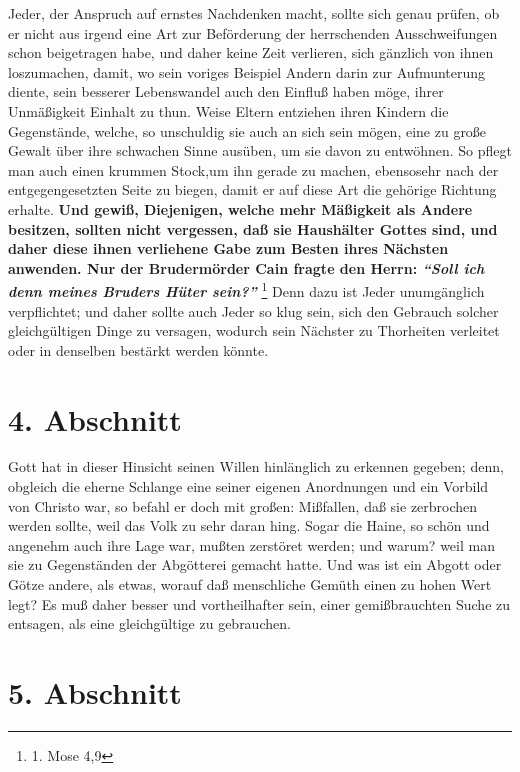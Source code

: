 Jeder, der Anspruch auf ernstes Nachdenken macht, sollte sich genau prüfen, ob
er nicht aus irgend eine Art zur Beförderung der herrschenden Ausschweifungen
schon beigetragen habe, und daher keine Zeit verlieren, sich gänzlich von ihnen
loszumachen, damit, wo sein voriges Beispiel Andern darin zur Aufmunterung
diente, sein besserer Lebenswandel auch den Einfluß haben möge, ihrer
Unmäßigkeit Einhalt zu thun. Weise Eltern
entziehen ihren Kindern die
Gegenstände, welche, so unschuldig sie auch an sich sein mögen, eine zu große
Gewalt über ihre schwachen Sinne ausüben, um sie davon zu entwöhnen. So pflegt
man auch einen krummen Stock,um ihn gerade zu machen, ebensosehr nach der
entgegengesetzten Seite zu biegen, damit er auf diese Art die gehörige Richtung
erhalte. \textbf{Und gewiß, Diejenigen, welche mehr
Mäßigkeit als Andere besitzen,
sollten nicht vergessen, daß sie Haushälter Gottes sind, und daher diese ihnen
verliehene Gabe zum Besten ihres Nächsten anwenden. Nur der Brudermörder
Cain
fragte den Herrn:
\textit{"`Soll ich denn meines Bruders Hüter sein?"'}}
\footnote{1. Mose 4,9}
Denn dazu ist Jeder unumgänglich verpflichtet; und daher sollte auch Jeder
so klug sein, sich den Gebrauch solcher gleichgültigen Dinge zu versagen,
wodurch sein Nächster zu Thorheiten verleitet oder in denselben bestärkt werden
könnte.

\section{4. Abschnitt} \label{kap18_ab4}

Gott hat in dieser Hinsicht seinen Willen hinlänglich zu erkennen gegeben; denn,
obgleich die eherne Schlange eine seiner eigenen Anordnungen und
ein Vorbild von
Christo war, so befahl er doch mit großen: Mißfallen, daß sie zerbrochen werden
sollte, weil das Volk zu sehr daran hing. Sogar die Haine, so schön und angenehm
auch ihre Lage war, mußten zerstöret werden; und warum? weil man sie zu
Gegenständen der Abgötterei gemacht hatte. Und was ist ein
Abgott oder Götze
andere, als etwas, worauf daß menschliche Gemüth einen zu hohen Wert legt? Es
muß daher besser und vortheilhafter sein, einer gemißbrauchten Suche zu
entsagen, als eine gleichgültige zu gebrauchen.

\section{5. Abschnitt} \label{kap18_ab5}


